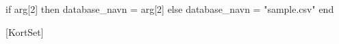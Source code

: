 \usepackage{luacode}
\usepackage{ifdraft}

\settypeblocksize{276mm}{200mm}{*} %
\setheaderspaces{*}{3mm}{*}
\checkandfixthelayout
\pagestyle{plain}
\makeatletter
{}
\newcommand{\Titel}{\@title}
\setlength{\parindent}{0mm}
\makeatother
\ifdraft{\usepackage{showframe}}{}

\begin{luacode}
    if arg[2] then
		database_navn = arg[2]
	else
		database_navn = "sample.csv"
    end
\end{luacode}
\usepackage{datatool}
\DTLsetseparator{,}

\usepackage{graphicx}
\graphicspath{{./Billeder/}}
\usepackage{pgffor}
\usepackage{tcolorbox}

[KortSet]

\title{}

